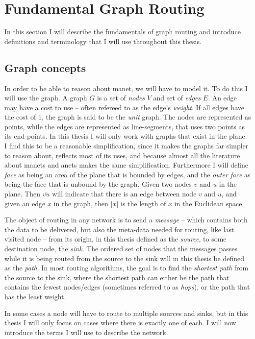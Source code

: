 \section{Fundamental Graph Routing}
\label{section:fundamental_graph_routing}
In this section I will describe the fundamentals of graph routing and introduce definitions and terminology that I will use throughout this thesis.

\subsection{Graph concepts}
\label{section:graph_concepts}
In order to be able to reason about \ac{manet}, we will have to model it. To do this I will use the graph. A graph $G$ is a set of \emph{nodes} $V$ and set of \emph{edges} $E$. An edge may have a cost to use -- often refereed to as the edge's \emph{weight}. If all edges have the cost of 1, the graph is said to be the \emph{unit} graph. The nodes are represented as points, while the edges are represented as line-segments, that uses two points as its end-points. In this thesis I will only work with graphs that exist in the plane. I find this to be a reasonable simplification, since it makes the graphs far simpler to reason about, reflects most of its uses, and because almost all the literature about \acp{manet} and \acp{anet} makes the same simplification. Furthermore I will define \emph{face} as being an area of the plane that is bounded by edges, and the \emph{outer face} as being the face that is unbound by the graph. Given two nodes $v$ and $u$ in the plane. Then $\overline{vu}$ will indicate that there is an edge between node $v$ and $u$, and given an edge $x$ in the graph, then $|x|$ is the length of $x$ in the Euclidean space.

The object of routing in any network is to send a \emph{message} -- which contains both the data to be delivered, but also the meta-data needed for routing, like last visited node -- from its origin, in this thesis defined as the \emph{source}, to some destination node, the \emph{sink}. The ordered set of nodes that the messages passes while it is being routed from the source to the sink will in this thesis be defined as the \emph{path}. In most routing algorithms, the goal is to find the \emph{shortest path} from the source to the sink, where the shortest path can either be the path that contains the fewest nodes/edges (sometimes referred to as \emph{hops}), or the path that has the least weight.

In some cases a node will have to route to  multiple sources and sinks, but in this thesis I will only focus on cases where there is exactly one of each. I will now introduce the terms I will use to describe the network.

